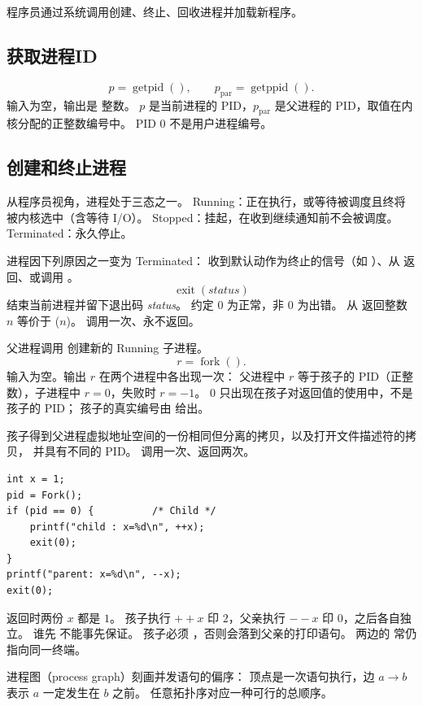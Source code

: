 程序员通过系统调用创建、终止、回收进程并加载新程序。

\subsection{获取进程ID}

\[
p=\operatorname{getpid}(),
\qquad
p_{\mathrm{par}}=\operatorname{getppid}().
\]
输入为空，输出是  整数。
$p$ 是当前进程的 PID，$p_{\mathrm{par}}$ 是父进程的 PID，取值在内核分配的正整数编号中。
PID $0$ 不是用户进程编号。

\subsection{创建和终止进程}

从程序员视角，进程处于三态之一。
Running：正在执行，或等待被调度且终将被内核选中（含等待 I/O）。
Stopped：挂起，在收到继续通知前不会被调度。
Terminated：永久停止。

进程因下列原因之一变为 Terminated：
收到默认动作为终止的信号（如 ）、从  返回、或调用 。
\[
\operatorname{exit}(\textit{status})
\]
结束当前进程并留下退出码 \textit{status}。
约定 $0$ 为正常，非 $0$ 为出错。
从  返回整数 $n$ 等价于 ($n$)。
 调用一次、永不返回。

父进程调用  创建新的 Running 子进程。
\[
r=\operatorname{fork}().
\]
输入为空。输出 $r$ 在两个进程中各出现一次：
父进程中 $r$ 等于孩子的 PID（正整数），子进程中 $r=0$，失败时 $r=-1$。
$0$ 只出现在孩子对返回值的使用中，不是孩子的 PID；
孩子的真实编号由  给出。

孩子得到父进程虚拟地址空间的一份相同但分离的拷贝，以及打开文件描述符的拷贝，
并具有不同的 PID。
 调用一次、返回两次。

\begin{lstlisting}
int x = 1;
pid = Fork();
if (pid == 0) {          /* Child */
    printf("child : x=%d\n", ++x);
    exit(0);
}
printf("parent: x=%d\n", --x);
exit(0);
\end{lstlisting}
 返回时两份 $x$ 都是 $1$。
孩子执行 ${++}x$ 印 $2$，父亲执行 ${--}x$ 印 $0$，之后各自独立。
谁先  不能事先保证。
孩子必须 ，否则会落到父亲的打印语句。
两边的  常仍指向同一终端。

进程图（process graph）刻画并发语句的偏序：
顶点是一次语句执行，边 $a\to b$ 表示 $a$ 一定发生在 $b$ 之前。
任意拓扑序对应一种可行的总顺序。

